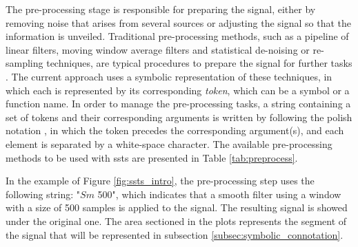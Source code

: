The pre-processing stage is responsible for preparing the signal, either by removing noise that arises from several sources or adjusting the signal so that the information is unveiled. Traditional pre-processing methods, such as a pipeline of linear filters, moving window average filters and statistical de-noising or re-sampling techniques, are typical procedures to prepare the signal for further tasks \cite{preProcessing}. The current approach uses a symbolic representation of these techniques, in which each is represented by its corresponding \textit{token}, which can be a symbol or a function name. In order to manage the pre-processing tasks, a string containing a set of tokens and their corresponding arguments is written by following the polish notation \cite{polishNotation}, in which the token precedes the corresponding argument(s), and each element is separated by a white-space character. The available pre-processing methods to be used with \gls{ssts} are presented in Table \ref{tab:preprocess}.
\par
In the example of Figure \ref{fig:ssts_intro}, the pre-processing step uses the following string: "$Sm$ 500", which indicates that a smooth filter using a window with a size of 500 samples is applied to the signal. The resulting signal is showed under the original one. The area sectioned in the plots represents the segment of the signal that will be represented in subsection \ref{subsec:symbolic_connotation}.

